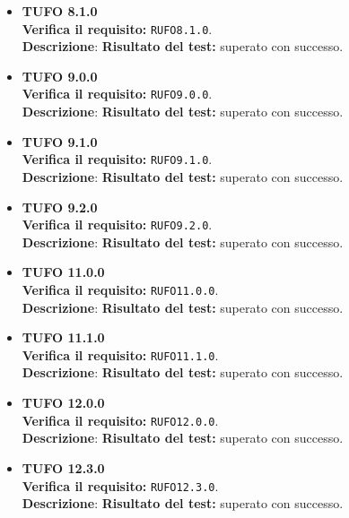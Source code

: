 \begin{itemize}
\item \textbf{TUFO 8.1.0}\\
\textbf{Verifica il requisito:} \texttt{RUFO8.1.0}.\\
\textbf{Descrizione}: %
\textbf{Risultato del test:} superato con successo.

\item \textbf{TUFO 9.0.0}\\
\textbf{Verifica il requisito:} \texttt{RUFO9.0.0}.\\
\textbf{Descrizione}: %
\textbf{Risultato del test:} superato con successo.

\item \textbf{TUFO 9.1.0}\\
\textbf{Verifica il requisito:} \texttt{RUFO9.1.0}.\\
\textbf{Descrizione}: %
\textbf{Risultato del test:} superato con successo.

\item \textbf{TUFO 9.2.0}\\
\textbf{Verifica il requisito:} \texttt{RUFO9.2.0}.\\
\textbf{Descrizione}: %
\textbf{Risultato del test:} superato con successo.

\item \textbf{TUFO 11.0.0}\\
\textbf{Verifica il requisito:} \texttt{RUFO11.0.0}.\\
\textbf{Descrizione}: %
\textbf{Risultato del test:} superato con successo.

\item \textbf{TUFO 11.1.0}\\
\textbf{Verifica il requisito:} \texttt{RUFO11.1.0}.\\
\textbf{Descrizione}: %
\textbf{Risultato del test:} superato con successo.

\item \textbf{TUFO 12.0.0}\\
\textbf{Verifica il requisito:} \texttt{RUFO12.0.0}.\\
\textbf{Descrizione}: %
\textbf{Risultato del test:} superato con successo.

\item \textbf{TUFO 12.3.0}\\
\textbf{Verifica il requisito:} \texttt{RUFO12.3.0}.\\
\textbf{Descrizione}: %
\textbf{Risultato del test:} superato con successo.


\end{itemize}
